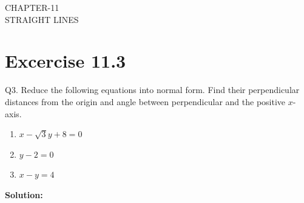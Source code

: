 \documentclass[12pt]{article}
\newcommand{\solution}{\noindent \textbf{Solution: }}
\begin{document}
\begin{center}
\textbf\large{CHAPTER-11 \\ STRAIGHT LINES}
\end{center}
\section*{Excercise 11.3}

Q3. Reduce the following equations into normal form. Find their perpendicular distances from the origin and angle between perpendicular and the positive $x$-axis.
\begin{enumerate}
	\item $x-\sqrt{3}y+8=0$ 
	\item $y-2=0$
	\item $x-y=4$
\end{enumerate}
\solution
\end{document}
